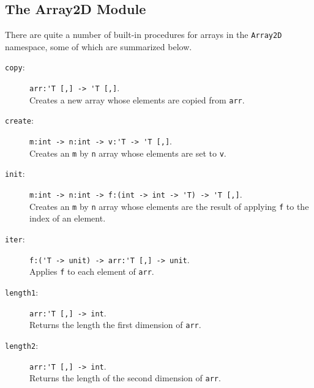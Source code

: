 \documentclass[fsharpNotes.tex]{subfiles}
\begin{document}
\subsection{The Array2D Module}
There are quite a number of built-in procedures for arrays in the \lstinline{Array2D} namespace, some of which are summarized below.
\begin{description}
\item[\texttt{copy}:] \lstinline{arr:'T [,] -> 'T [,]}.~\\
  Creates a new array whose elements are copied from \lstinline{arr}.
\item[\texttt{create}:] \lstinline{m:int -> n:int -> v:'T -> 'T [,]}.~\\
  Creates an \lstinline{m} by \lstinline{n} array whose elements are set to \lstinline{v}.
\item[\texttt{init}:] \lstinline{m:int -> n:int -> f:(int -> int -> 'T) -> 'T [,]}.~\\
  Creates an \lstinline{m} by \lstinline{n} array whose elements are the result of applying \lstinline{f} to the index of an element.
\item[\texttt{iter}:] \lstinline{f:('T -> unit) -> arr:'T [,] -> unit}.~\\
  Applies \lstinline{f} to each element of \lstinline{arr}.
\item[\texttt{length1}:] \lstinline{arr:'T [,] -> int}.~\\
  Returns the length the first dimension of \lstinline{arr}.
\item[\texttt{length2}:] \lstinline{arr:'T [,] -> int}.~\\
  Returns the length of the second dimension of \lstinline{arr}.

\end{description}
\end{document}
